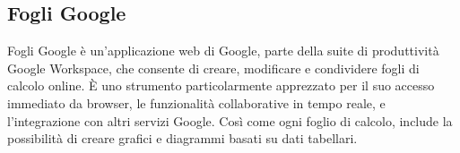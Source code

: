 \subsection*{Fogli Google}
Fogli Google è un'applicazione web di Google, parte della suite di produttività Google Workspace, che consente di creare, modificare e condividere fogli 
di calcolo online. È uno strumento particolarmente apprezzato per il suo accesso immediato da browser, le funzionalità collaborative in tempo reale, e 
l'integrazione con altri servizi Google. Così come ogni foglio di calcolo, include la possibilità di creare grafici e diagrammi basati su dati tabellari.

\newpage